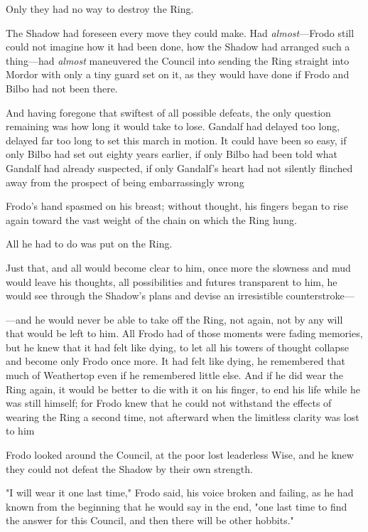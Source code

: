 Only they had no way to destroy the Ring.

The Shadow had foreseen every move they could make. Had \emph{almost}---Frodo
still could not imagine how it had been done, how the Shadow had arranged such
a thing---had \emph{almost} maneuvered the Council into sending the Ring
straight into Mordor with only a tiny guard set on it, as they would have done
if Frodo and Bilbo had not been there.

And having foregone that swiftest of all possible defeats, the only question
remaining was how long it would take to lose. Gandalf had delayed too long,
delayed far too long to set this march in motion. It could have been so easy,
if only Bilbo had set out eighty years earlier, if only Bilbo had been told
what Gandalf had already suspected, if only Gandalf's heart had not silently
flinched away from the prospect of being embarrassingly wrong{\el}

Frodo's hand spasmed on his breast; without thought, his fingers began to rise
again toward the vast weight of the chain on which the Ring hung.

All he had to do was put on the Ring.

Just that, and all would become clear to him, once more the slowness and mud
would leave his thoughts, all possibilities and futures transparent to him, he
would see through the Shadow's plans and devise an irresistible counterstroke---

---and he would never be able to take off the Ring, not again, not by any will
that would be left to him. All Frodo had of those moments were fading memories,
but he knew that it had felt like dying, to let all his towers of thought
collapse and become only Frodo once more. It had felt like dying, he remembered
that much of Weathertop even if he remembered little else. And if he did wear
the Ring again, it would be better to die with it on his finger, to end his
life while he was still himself; for Frodo knew that he could not withstand the
effects of wearing the Ring a second time, not afterward when the limitless
clarity was lost to him{\el}

Frodo looked around the Council, at the poor lost leaderless Wise, and he knew
they could not defeat the Shadow by their own strength.

"I will wear it one last time," Frodo said, his voice broken and failing, as he
had known from the beginning that he would say in the end, "one last time to
find the answer for this Council, and then there will be other hobbits."

